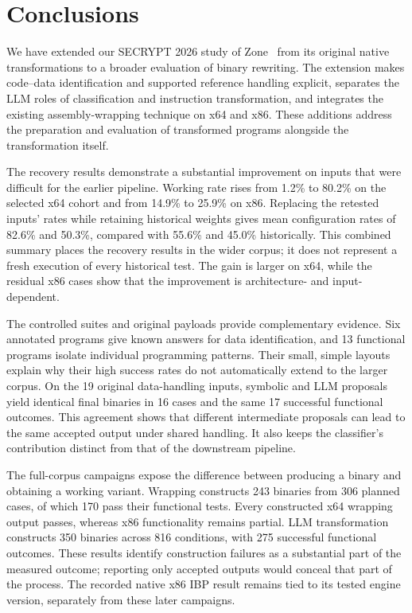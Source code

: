 \section{Conclusions}\label{sec:conclusion3}\label{sec:extension_limits}
We have extended our SECRYPT 2026 study of Zone~\cite{zone_secrypt_2026}
from its original native transformations to a broader evaluation of
binary rewriting. The extension makes code--data identification and
supported reference handling explicit, separates the LLM roles of
classification and instruction transformation, and integrates the
existing assembly-wrapping technique on x64 and x86. These additions
address the preparation and evaluation of transformed programs alongside
the transformation itself.

The recovery results demonstrate a substantial improvement on inputs
that were difficult for the earlier pipeline. Working rate rises from
1.2\% to 80.2\% on the selected x64 cohort and from 14.9\% to 25.9\% on
x86. Replacing the retested inputs' rates while retaining historical
weights gives mean configuration rates of 82.6\% and 50.3\%, compared
with 55.6\% and 45.0\% historically. This combined summary places the
recovery results in the wider corpus; it does not represent a fresh
execution of every historical test. The gain is larger on x64, while
the residual x86 cases show that the improvement is architecture- and
input-dependent.

The controlled suites and original payloads provide complementary
evidence. Six annotated programs give known answers for data
identification, and 13 functional programs isolate individual programming
patterns. Their small, simple layouts explain why their high success
rates do not automatically extend to the larger corpus. On the 19
original data-handling inputs, symbolic and LLM proposals yield identical
final binaries in 16 cases and the same 17 successful functional outcomes.
This agreement shows that different intermediate proposals can lead to
the same accepted output under shared handling. It also keeps the
classifier's contribution distinct from that of the downstream pipeline.

The full-corpus campaigns expose the difference between producing a
binary and obtaining a working variant. Wrapping constructs 243 binaries
from 306 planned cases, of which 170 pass their functional tests. Every
constructed x64 wrapping output passes, whereas x86 functionality remains
partial. LLM transformation constructs 350 binaries across 816 conditions,
with 275 successful functional outcomes. These results identify
construction failures as a substantial part of the measured outcome;
reporting only accepted outputs would conceal that part of the process.
The recorded native x86 IBP result remains tied to its tested engine
version, separately from these later campaigns.

